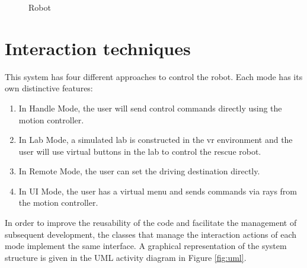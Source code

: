 \begin{figure}[htbp]
    \centering
    \caption{Robot}
    \label{fig:robot} 
\end{figure}



\section{Interaction techniques}
This system has four different approaches to control the robot. Each mode has its own distinctive features: 

\begin{enumerate}
\item In Handle Mode, the user will send control commands directly using the motion controller. 
\item In Lab Mode, a simulated lab is constructed in the \gls{vr} environment and the user will use virtual buttons in the lab to control the rescue robot. 
\item In Remote Mode, the user can set the driving destination directly. 
\item In UI Mode, the user has a virtual menu and sends commands via rays from the motion controller.
\end{enumerate}

In order to improve the reusability of the code and facilitate the management of subsequent development, the classes that manage the interaction actions of each mode implement the same interface. A graphical representation of the system structure is given in the UML activity diagram in Figure \ref{fig:uml}.

